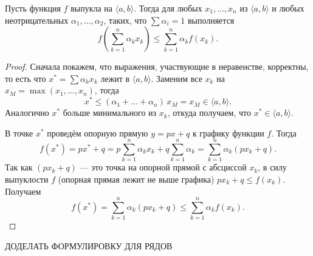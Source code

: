 \begin{theorem} \hypertarget{Йенсен-суммы}{}
	Пусть функция \(f\) выпукла на \(\langle a, b \rangle\). Тогда для любых \(x_1, \ldots, x_n\) из \(\langle a, b \rangle\) и любых неотрицательных \(\alpha_1, \ldots, \alpha_2\), таких, что \(\sum \alpha_i = 1\) выполняется \[
		f \left(\sum_{k=1}^n \alpha_k x_k \right) \leqslant \sum_{k=1}^n \alpha_k f(x_k). 
	\]
\end{theorem}
\begin{proof}
	Сначала покажем, что выражения, участвующие в неравенстве, корректны, то есть что \(x^* = \sum \alpha_k x_k\) лежит в  \(\langle a, b \rangle\). Заменим все \(x_k\) на \(x_M = \max(x_1, \ldots, x_n)\), тогда \[
		x^* \leqslant (\alpha_1 + \ldots + \alpha_n) \, x_M = x_M \in \langle a, b \rangle.
	\]
	Аналогично \(x^*\) больше минимального из \(x_k\), откуда получаем, что \(x^* \in \langle a, b \rangle\).
	
	В точке \(x^*\) проведём опорную прямую \(y = px + q\) к графику функции \(f\). Тогда \[
		f(x^*) = px^* + q = p \sum_{k=1}^n \alpha_k x_k + q \sum_{k=1}^n \alpha_k = \sum_{k=1}^n \alpha_k (px_k + q).
	\]
	Так как \((px_k + q)\) --- это точка на опорной прямой с абсциссой \(x_k\), в силу выпуклости \(f\) (опорная прямая лежит не выше графика) \(px_k + q \leqslant f(x_k)\). Получаем \[
		f(x^*) = \sum_{k=1}^n \alpha_k (px_k + q) \leqslant \sum_{k=1}^n \alpha_k f(x_k).
	\]
\end{proof}

ДОДЕЛАТЬ ФОРМУЛИРОВКУ ДЛЯ РЯДОВ

